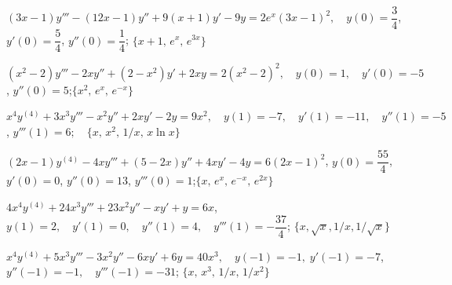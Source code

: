 \begin{exerciselist}
\item\label{exer:9.4.28}$(3x-1)y'''-(12x-1)y''+9(x+1)y'-9y=2e^x(3x-1)^2, \quad  y(0)=\dfrac{3}{4}$,
$y'(0)=\dfrac{5}{4}$, \quad  $y''(0)=\dfrac{1}{4}$;\quad
$\{x+1,\,e^x,\,e^{3x}\}$

\item\label{exer:9.4.29}\CGex
$(x^2-2)y'''-2xy''+(2-x^2)y'+2xy=2(x^2-2)^2, \quad  y(0)=1,\quad y'(0)=-5$,
 $y''(0)=5$;\quad      $\{x^2,\,e^x,\,e^{-x}\}$

\item\label{exer:9.4.30}\CGex
$x^4y^{(4)}+3x^3y'''-x^2y''+2xy'-2y=9x^2, \quad  y(1)=-7,\quad y'(1)=
-11,\quad y''(1)=-5$,\;
$y'''(1)=6; \quad \{x,\,x^2,\,1/x,\,x\ln x\}$

\item\label{exer:9.4.31}$(2x-1)y^{(4)}-4xy'''+(5-2x)y''+4xy'-4y=6(2x-1)^2$, \quad  $y(0)=\dfrac{55}{4}$,\quad $y'(0)=0$, $y''(0)=13$, \quad  $y'''(0)=1$;\quad    $\{x,\,e^x,\,e^{-x},\,e^{2x}\}$

\item\label{exer:9.4.32}$4x^4y^{(4)}+24x^3y'''+23x^2y''-xy'+y=6x$,\quad $y(1)=2,\quad
y'(1)=0,\quad y''(1)=4,\quad y'''(1)=-\dfrac{37}{4}$;
\quad $\{x,\sqrt x,1/x,1/\sqrt x\}$

\item\label{exer:9.4.33}$x^4y^{{(4)}}+5x^3y'''-3x^2y''-6xy'+6y=40x^3,
\quad  y(-1)=-1, \;  y'(-1)=-7$,
$y''(-1)=-1,\quad y'''(-1)=-31$;\quad
$\{x,\, x^3,\,1/x,\,1/x^2\}$


\end{exerciselist}
